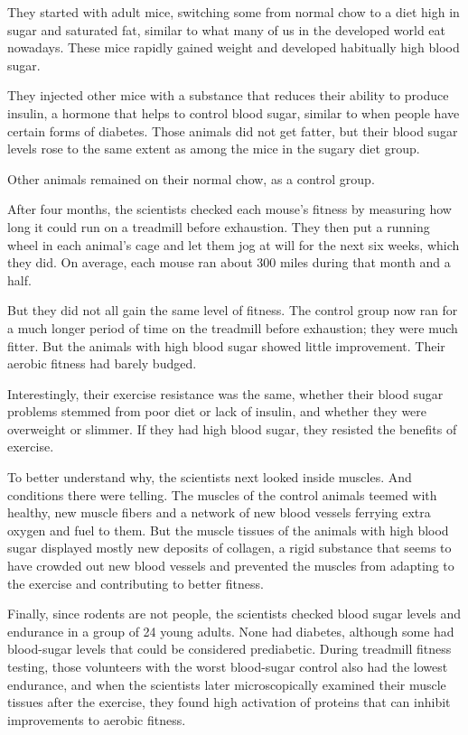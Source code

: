 They started with adult mice, switching some from normal chow to a diet
high in sugar and saturated fat, similar to what many of us in the
developed world eat nowadays. These mice rapidly gained weight and
developed habitually high blood sugar.

They injected other mice with a substance that reduces their ability to
produce insulin, a hormone that helps to control blood sugar, similar to
when people have certain forms of diabetes. Those animals did not get
fatter, but their blood sugar levels rose to the same extent as among
the mice in the sugary diet group.

Other animals remained on their normal chow, as a control group.

After four months, the scientists checked each mouse's fitness by
measuring how long it could run on a treadmill before exhaustion. They
then put a running wheel in each animal's cage and let them jog at will
for the next six weeks, which they did. On average, each mouse ran about
300 miles during that month and a half.

But they did not all gain the same level of fitness. The control group
now ran for a much longer period of time on the treadmill before
exhaustion; they were much fitter. But the animals with high blood sugar
showed little improvement. Their aerobic fitness had barely budged.

Interestingly, their exercise resistance was the same, whether their
blood sugar problems stemmed from poor diet or lack of insulin, and
whether they were overweight or slimmer. If they had high blood sugar,
they resisted the benefits of exercise.

To better understand why, the scientists next looked inside muscles. And
conditions there were telling. The muscles of the control animals teemed
with healthy, new muscle fibers and a network of new blood vessels
ferrying extra oxygen and fuel to them. But the muscle tissues of the
animals with high blood sugar displayed mostly new deposits of collagen,
a rigid substance that seems to have crowded out new blood vessels and
prevented the muscles from adapting to the exercise and contributing to
better fitness.

Finally, since rodents are not people, the scientists checked blood
sugar levels and endurance in a group of 24 young adults. None had
diabetes, although some had blood-sugar levels that could be considered
prediabetic. During treadmill fitness testing, those volunteers with the
worst blood-sugar control also had the lowest endurance, and when the
scientists later microscopically examined their muscle tissues after the
exercise, they found high activation of proteins that can inhibit
improvements to aerobic fitness.

